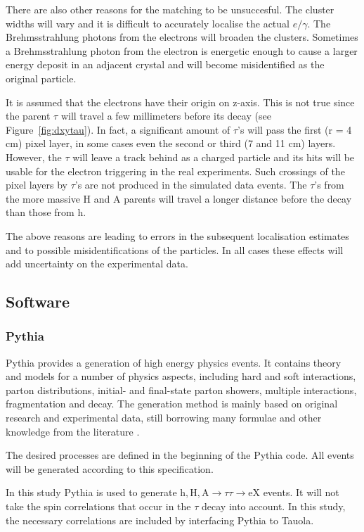 \documentclass[a4paper,12pt,titlepage]{article}
\begin{document}
There are also other reasons for the matching to be unsuccesful. The cluster widths will vary and it is difficult to accurately localise the actual $e/\gamma$. The Brehmsstrahlung photons from the electrons will broaden the clusters. Sometimes a Brehmsstrahlung photon from the electron is energetic enough to cause a larger energy deposit in an adjacent crystal and will become misidentified as the original particle. 

It is assumed that the electrons have their origin on z-axis. This is not true since the parent $\tau$ will travel a few millimeters before its decay (see Figure~\ref{fig:dxytau}). In fact, a significant amount of $\tau$'s will pass the first (r = 4 cm) pixel layer, in some cases even the second or third (7 and 11 cm) layers. However, the $\tau$ will leave a track behind as a charged particle and its hits will be usable for the electron triggering in the real experiments. Such crossings of the pixel layers by $\tau$'s are not produced in the simulated data events. The $\tau$'s from the more massive $\mathrm{H}$ and $\mathrm{A}$ parents will travel a longer distance before the decay than those from $\mathrm{h}$. 

The above reasons are leading to errors in the subsequent localisation estimates and to possible misidentifications of the particles. In all cases these effects will add uncertainty on the experimental data.

\subsection{Software}
\subsubsection{Pythia}
Pythia provides a generation of high energy physics events. It contains theory and models for a number of physics aspects, including hard and soft interactions, parton distributions, initial- and final-state parton showers, multiple interactions, fragmentation and decay. The generation method is mainly based on original research and experimental data, still borrowing many formulae and other knowledge from the literature \cite{Pythia}. 

The desired processes are defined in the beginning of the Pythia code. All events will be generated according to this specification. 

In this study Pythia is used to generate $\mathrm{h, H, A} \rightarrow \tau \tau \rightarrow \mathrm{eX}$ events. It will not take the spin correlations that occur in the $\tau$ decay into account. In this study, the necessary correlations are included by interfacing Pythia to Tauola.
\end{document}
